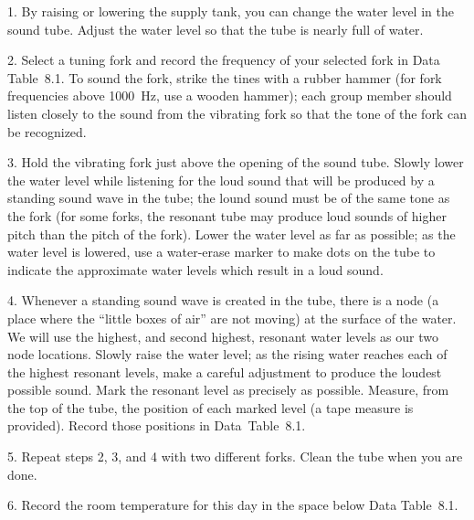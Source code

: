 \item{1.} By raising or lowering the supply tank, you
can change the water level in the sound tube.  Adjust
the water level so that the tube is nearly full of water.
\item{2.} Select a tuning fork and record the frequency
of your selected fork in Data Table~8.1.  To sound the
fork, strike the tines with a rubber hammer (for fork
frequencies above 1000~Hz, use a wooden hammer); each
group member should listen closely to the sound from the
vibrating fork so that the tone of the fork can be recognized.
\item{3.} Hold the vibrating fork just above the opening
of the sound tube.  Slowly lower the water level while
listening for the loud sound that will be produced by a
standing sound wave in the tube; the lound sound must be
of the same tone as the fork (for some forks, the resonant
tube may produce loud sounds of higher pitch than the
pitch of the fork).  Lower the water level as far as
possible; as the water level is lowered, use a water-erase
marker to make dots on the tube to indicate the
approximate water levels which result in a loud sound.
\item{4.} Whenever a standing sound wave is created in
the tube, there is a node (a place where the ``little 
boxes of air'' are not moving) at the surface of the 
water.  We will use the highest, and second highest, 
resonant water levels as our two node locations.  Slowly 
raise the water level; as the rising water reaches each of 
the highest resonant levels, make a careful adjustment
to produce the loudest possible sound.  Mark the resonant 
level as precisely as possible.   Measure, from the top of 
the tube, the position of each marked level (a tape measure 
is provided).  Record those positions in Data~Table~8.1.
\item{5.} Repeat steps 2, 3, and 4 with two different forks.  
Clean the tube when you are done.
\item{6.} Record the room temperature for this day
in the space below Data Table~8.1.
\bigskip
